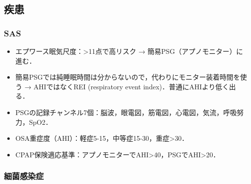 \subsection{疾患}

\subsubsection{SAS}

\begin{itemize}
\item エプワース眠気尺度：>11点で高リスク → 簡易PSG（アプノモニター）に進む．


\item 簡易PSGでは純睡眠時間は分からないので，代わりにモニター装着時間を使う → AHIではなくREI (respiratory event index)．普通にAHIより低く出る．
\item PSGの記録チャンネル7個：脳波，眼電図，筋電図，心電図，気流，呼吸努力，SpO2．
\item OSA重症度（AHI）：軽症5-15，中等症15-30，重症>30．
\item CPAP保険適応基準：アプノモニターでAHI>40，PSGでAHI>20．
\end{itemize}


\subsubsection{細菌感染症}

